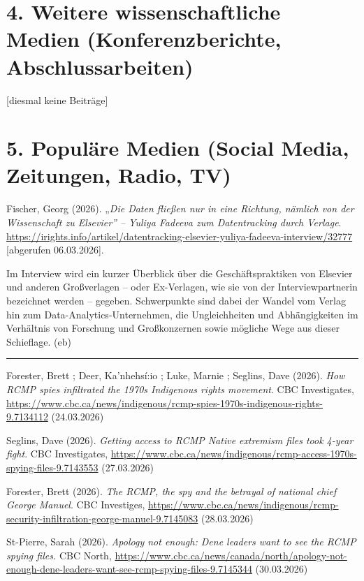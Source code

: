 \documentclass[a4paper,
fontsize=11pt,
oneside,
numbers=noperiodatend,
parskip=half-,
bibliography=totoc,
final
]{scrartcl}
\begin{document}
\section{4. Weitere wissenschaftliche Medien (Konferenzberichte,
Abschlussarbeiten)}\label{weitere-wissenschaftliche-medien-konferenzberichte-abschlussarbeiten}

{[}diesmal keine Beiträge{]}

\section{5. Populäre Medien (Social Media, Zeitungen, Radio,
TV)}\label{populuxe4re-medien-social-media-zeitungen-radio-tv}

Fischer, Georg (2026). „\emph{Die Daten fließen nur in eine Richtung,
nämlich von der Wissenschaft zu Elsevier'' -- Yuliya Fadeeva zum
Datentracking durch Verlage}.
\url{https://irights.info/artikel/datentracking-elsevier-yuliya-fadeeva-interview/32777}
{[}abgerufen 06.03.2026{]}.

Im Interview wird ein kurzer Überblick über die Geschäftspraktiken von
Elsevier und anderen Großverlagen -- oder Ex-Verlagen, wie sie von der
Interviewpartnerin bezeichnet werden -- gegeben. Schwerpunkte sind dabei
der Wandel vom Verlag hin zum Data-Analytics-Unternehmen, die
Ungleichheiten und Abhängigkeiten im Verhältnis von Forschung und
Großkonzernen sowie mögliche Wege aus dieser Schieflage. (eb)

\begin{center}\rule{0.5\linewidth}{0.5pt}\end{center}

Forester, Brett ; Deer, Ka'nhehsí:io ; Luke, Marnie ; Seglins, Dave
(2026). \emph{How RCMP spies infiltrated the 1970s Indigenous rights
movement}. CBC Investigates,
\url{https://www.cbc.ca/news/indigenous/rcmp-spies-1970s-indigenous-rights-9.7134112}
(24.03.2026)

Seglins, Dave (2026). \emph{Getting access to RCMP
\textquotesingle Native extremism\textquotesingle{} files took 4-year
fight}. CBC Investigates,
\url{https://www.cbc.ca/news/indigenous/rcmp-access-1970s-spying-files-9.7143553}
(27.03.2026)

Forester, Brett (2026). \emph{The RCMP, the spy and the betrayal of
national chief George Manuel}. CBC Investiges,
\url{https://www.cbc.ca/news/indigenous/rcmp-security-infiltration-george-manuel-9.7145083}
(28.03.2026)

St-Pierre, Sarah (2026). \emph{Apology \textquotesingle not
enough\textquotesingle: Dene leaders want to see the RCMP spying files.}
CBC North,
\url{https://www.cbc.ca/news/canada/north/apology-not-enough-dene-leaders-want-see-rcmp-spying-files-9.7145344}
(30.03.2026)
\end{document}
